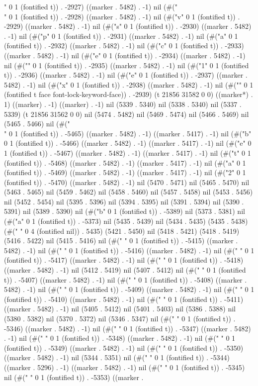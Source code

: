 " 0 1 (fontified t)) . -2927) ((marker . 5482) . -1) nil (#("\\" 0 1 (fontified t)) . -2928) ((marker . 5482) . -1) nil (#("v" 0 1 (fontified t)) . -2929) ((marker . 5482) . -1) nil (#("s" 0 1 (fontified t)) . -2930) ((marker . 5482) . -1) nil (#("p" 0 1 (fontified t)) . -2931) ((marker . 5482) . -1) nil (#("a" 0 1 (fontified t)) . -2932) ((marker . 5482) . -1) nil (#("c" 0 1 (fontified t)) . -2933) ((marker . 5482) . -1) nil (#("e" 0 1 (fontified t)) . -2934) ((marker . 5482) . -1) nil (#("{" 0 1 (fontified t)) . -2935) ((marker . 5482) . -1) nil (#("1" 0 1 (fontified t)) . -2936) ((marker . 5482) . -1) nil (#("e" 0 1 (fontified t)) . -2937) ((marker . 5482) . -1) nil (#("x" 0 1 (fontified t)) . -2938) ((marker . 5482) . -1) nil (#("}" 0 1 (fontified t face font-lock-keyword-face)) . -2939) (t 21856 31582 0 0) ((marker*) . 1) ((marker) . -1) ((marker) . -1) nil (5339 . 5340) nil (5338 . 5340) nil (5337 . 5339) (t 21856 31562 0 0) nil (5474 . 5482) nil (5469 . 5474) nil (5466 . 5469) nil (5465 . 5466) nil (#("\\" 0 1 (fontified t)) . -5465) ((marker . 5482) . -1) ((marker . 5417) . -1) nil (#("b" 0 1 (fontified t)) . -5466) ((marker . 5482) . -1) ((marker . 5417) . -1) nil (#("e" 0 1 (fontified t)) . -5467) ((marker . 5482) . -1) ((marker . 5417) . -1) nil (#("t" 0 1 (fontified t)) . -5468) ((marker . 5482) . -1) ((marker . 5417) . -1) nil (#("a" 0 1 (fontified t)) . -5469) ((marker . 5482) . -1) ((marker . 5417) . -1) nil (#("2" 0 1 (fontified t)) . -5470) ((marker . 5482) . -1) nil (5470 . 5471) nil (5465 . 5470) nil (5463 . 5465) nil (5459 . 5462) nil (5458 . 5460) nil (5457 . 5458) nil (5453 . 5456) nil (5452 . 5454) nil (5395 . 5396) nil (5394 . 5395) nil (5391 . 5394) nil (5390 . 5391) nil (5389 . 5390) nil (#("b" 0 1 (fontified t)) . -5389) nil (5373 . 5381) nil (#("a" 0 1 (fontified t)) . -5373) nil (5435 . 5439) nil (5434 . 5435) (5435 . 5438) (#("    " 0 4 (fontified nil)) . 5435) (5421 . 5450) nil (5418 . 5421) (5418 . 5419) (5416 . 5422) nil (5415 . 5416) nil (#(" " 0 1 (fontified t)) . -5415) ((marker . 5482) . -1) nil (#(" " 0 1 (fontified t)) . -5416) ((marker . 5482) . -1) nil (#(" " 0 1 (fontified t)) . -5417) ((marker . 5482) . -1) nil (#(" " 0 1 (fontified t)) . -5418) ((marker . 5482) . -1) nil (5412 . 5419) nil (5407 . 5412) nil (#(" " 0 1 (fontified t)) . -5407) ((marker . 5482) . -1) nil (#(" " 0 1 (fontified t)) . -5408) ((marker . 5482) . -1) nil (#(" " 0 1 (fontified t)) . -5409) ((marker . 5482) . -1) nil (#(" " 0 1 (fontified t)) . -5410) ((marker . 5482) . -1) nil (#(" " 0 1 (fontified t)) . -5411) ((marker . 5482) . -1) nil (5405 . 5412) nil (5401 . 5403) nil (5386 . 5388) nil (5380 . 5382) nil (5370 . 5372) nil (5346 . 5347) nil (#(" " 0 1 (fontified t)) . -5346) ((marker . 5482) . -1) nil (#(" " 0 1 (fontified t)) . -5347) ((marker . 5482) . -1) nil (#(" " 0 1 (fontified t)) . -5348) ((marker . 5482) . -1) nil (#(" " 0 1 (fontified t)) . -5349) ((marker . 5482) . -1) nil (#(" " 0 1 (fontified t)) . -5350) ((marker . 5482) . -1) nil (5344 . 5351) nil (#(" " 0 1 (fontified t)) . -5344) ((marker . 5296) . -1) ((marker . 5482) . -1) nil (#(" " 0 1 (fontified t)) . -5345) nil (#(" " 0 1 (fontified t)) . -5353) ((marker . 